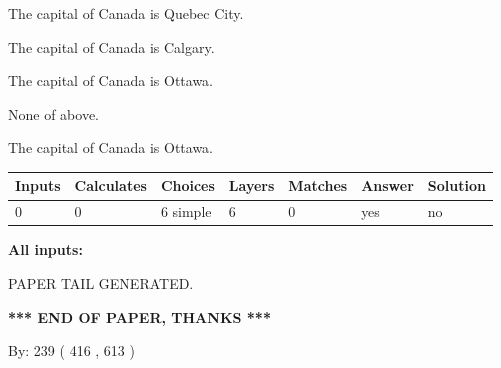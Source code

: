 \documentclass[12pt]{article}
\begin{document}
 
The capital of Canada is Quebec City.
 
 
The capital of Canada is Calgary.
 
 
The capital of Canada is Ottawa.
 
 
 None of above.
 
 
\noindent{}
 
 
The capital of Canada is Ottawa.
 
 
\noindent{}
 
 
   
   
   
   
\noindent\begin{tabular}{|l|l|l|l|l|l|l|}
 \hline
Inputs & Calculates & Choices & Layers & Matches & Answer & Solution \\ \hline
 0  & 
 0  & 
 6
  simple  
  & 
 6  & 
 0  & 
  yes & 
  no 
  \\ \hline
 \end{tabular}
   
   
   
   
\noindent{}
   
   
   
   
\noindent\vspace{0.1in}\hspace{-0.08in} {\textbf{\Large{All inputs: }}}
   
   
   
   
   
   
 \vspace{0.2in}
 
   
   
\vspace{2.0in} PAPER TAIL GENERATED.
   
   
   
   
\vspace{1.0in} 
{\textbf{\large{ *** END OF PAPER, THANKS *** }}} 
   
   
\hspace{1.0in} By: 
 239 ( 416 ,  613 )
   
   
   
   
\newpage 
\setcounter{page}{ 
   542001 } 
   
\end{document}
